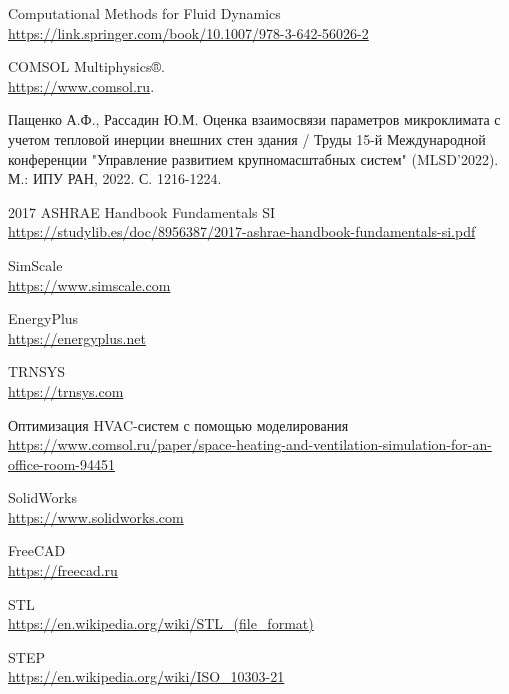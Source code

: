 \documentclass[a4paper,article,14pt]{extarticle}
\begin{document}


\tableofcontents
\pagebreak






\newpage
\begin{thebibliography}{1}

 Computational Methods for Fluid Dynamics\\
\url{https://link.springer.com/book/10.1007/978-3-642-56026-2}

 COMSOL Multiphysics®﻿.\\
\url{https://www.comsol.ru}.

 Пащенко А.Ф., Рассадин Ю.М. Оценка взаимосвязи параметров микроклимата с учетом тепловой инерции внешних стен здания / Труды 15-й Международной конференции "Управление развитием крупномасштабных систем" (MLSD’2022). М.: ИПУ РАН, 2022. С. 1216-1224.

 2017 ASHRAE Handbook Fundamentals SI \\
\url{https://studylib.es/doc/8956387/2017-ashrae-handbook-fundamentals-si.pdf}

 SimScale\\
\url{https://www.simscale.com}

 EnergyPlus\\
\url{https://energyplus.net}

 TRNSYS\\
\url{https://trnsys.com}

 Оптимизация HVAC-систем с помощью моделирования\\
\url{https://www.comsol.ru/paper/space-heating-and-ventilation-simulation-for-an-office-room-94451}

 SolidWorks\\
\url{https://www.solidworks.com}

 FreeCAD\\
\url{https://freecad.ru}

 STL\\
\url{https://en.wikipedia.org/wiki/STL_(file_format)}

 STEP\\
\url{https://en.wikipedia.org/wiki/ISO_10303-21}


\end{thebibliography}
\end{document}
